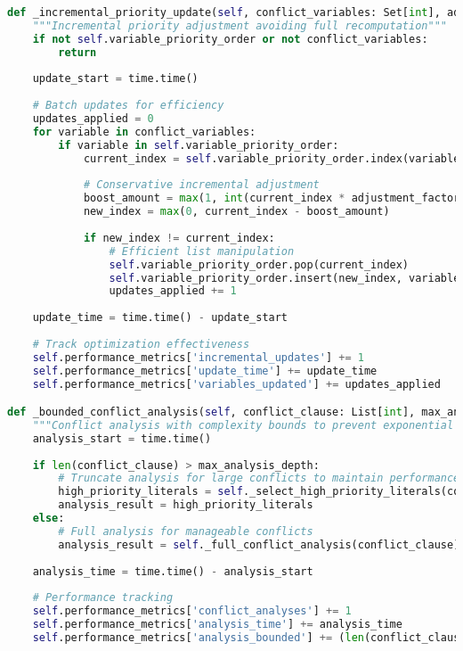 \begin{lstlisting}[language=Python, caption=Complexity Optimization Implementations]
def _incremental_priority_update(self, conflict_variables: Set[int], adjustment_factor: float = 0.1):
    """Incremental priority adjustment avoiding full recomputation"""
    if not self.variable_priority_order or not conflict_variables:
        return
    
    update_start = time.time()
    
    # Batch updates for efficiency
    updates_applied = 0
    for variable in conflict_variables:
        if variable in self.variable_priority_order:
            current_index = self.variable_priority_order.index(variable)
            
            # Conservative incremental adjustment
            boost_amount = max(1, int(current_index * adjustment_factor))
            new_index = max(0, current_index - boost_amount)
            
            if new_index != current_index:
                # Efficient list manipulation
                self.variable_priority_order.pop(current_index)
                self.variable_priority_order.insert(new_index, variable)
                updates_applied += 1
    
    update_time = time.time() - update_start
    
    # Track optimization effectiveness
    self.performance_metrics['incremental_updates'] += 1
    self.performance_metrics['update_time'] += update_time
    self.performance_metrics['variables_updated'] += updates_applied

def _bounded_conflict_analysis(self, conflict_clause: List[int], max_analysis_depth: int = 10) -> List[int]:
    """Conflict analysis with complexity bounds to prevent exponential blowup"""
    analysis_start = time.time()
    
    if len(conflict_clause) > max_analysis_depth:
        # Truncate analysis for large conflicts to maintain performance
        high_priority_literals = self._select_high_priority_literals(conflict_clause, max_analysis_depth)
        analysis_result = high_priority_literals
    else:
        # Full analysis for manageable conflicts
        analysis_result = self._full_conflict_analysis(conflict_clause)
    
    analysis_time = time.time() - analysis_start
    
    # Performance tracking
    self.performance_metrics['conflict_analyses'] += 1
    self.performance_metrics['analysis_time'] += analysis_time
    self.performance_metrics['analysis_bounded'] += (len(conflict_clause) > max_analysis_depth)
    

\end{lstlisting}
